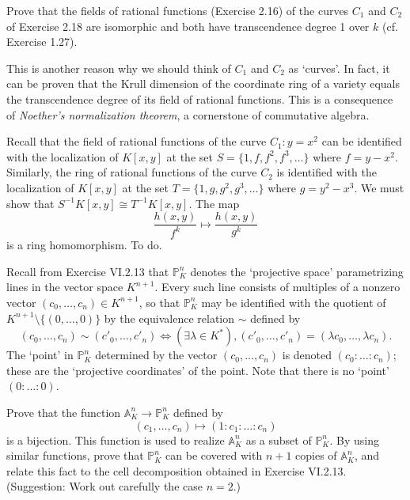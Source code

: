 \documentclass[../../master.tex]{subfiles}
\begin{document}
\begin{problem}
    Prove that the fields of rational functions (Exercise 2.16) of the curves $C_1$ and $C_2$ of Exercise 2.18 are isomorphic and both have transcendence degree 1 over $k$ (cf. Exercise 1.27).

    This is another reason why we should think of $C_1$ and $C_2$ as `curves'.
    In fact, it can be proven that the Krull dimension of the coordinate ring of a variety equals the transcendence degree of its field of rational functions.
    This is a consequence of \textit{Noether's normalization theorem}, a cornerstone of commutative algebra.
\end{problem}

\begin{solution}
    Recall that the field of rational functions of the curve $C_1 : y = x^2$ can be identified with the localization of $K[x, y]$ at the set $S = \{1, f, f^2, f^3, \ldots\}$ where $f = y - x^2$.
    Similarly, the ring of rational functions of the curve $C_2$ is identified with the localization of $K[x, y]$ at the set $T = \{1, g, g^2, g^3, \ldots\}$ where $g = y^2 - x^3$.
    We must show that $S^{-1}K[x, y] \cong T^{-1}K[x, y]$.
    The map 
    \[
        \frac{h(x, y)}{f^{k}} \mapsto \frac{h(x, y)}{g^{k}}
    \]
    is a ring homomorphism.
    To do.
\end{solution}

\begin{problem}
    Recall from Exercise VI.2.13 that $\mathbb{P}^{n}_K$ denotes the `projective space' parametrizing lines in the vector space $K^{n+1}$.
    Every such line consists of multiples of a nonzero vector $(c_0, \ldots, c_n) \in K^{n+1}$, so that $\mathbb{P}^{n}_K$ may be identified with the quotient of $K^{n+1} \setminus \{(0, \ldots, 0)\}$ by the equivalence relation $\sim$ defined by
    \[
        (c_0, \ldots, c_n) \sim (c'_0, \ldots, c'_n) \Longleftrightarrow (\exists \lambda \in K^{*}), (c'_0, \ldots, c'_n) = (\lambda c_0, \ldots, \lambda c_n).
    \]
    The `point' in $\mathbb{P}^{n}_K$ determined by the vector $(c_0, \ldots, c_n)$ is denoted $(c_0 : \ldots : c_n)$;
    these are the `projective coordinates' of the point.
    Note that there is no `point' $(0 : \ldots : 0)$.

    Prove that the function $\mathbb{A}^{n}_K \to \mathbb{P}^{n}_K$ defined by
    \[
        (c_1, \ldots, c_n) \mapsto (1 : c_1 : \ldots : c_n)
    \]
    is a bijection.
    This function is used to realize $\mathbb{A}^{n}_K$ as a subset of $\mathbb{P}^{n}_K$.
    By using similar functions, prove that $\mathbb{P}^{n}_K$ can be covered with $n + 1$ copies of $\mathbb{A}^{n}_K$, and relate this fact to the cell decomposition obtained in Exercise VI.2.13.
    (Suggestion: Work out carefully the case $n = 2$.)
\end{problem}
\end{document}
